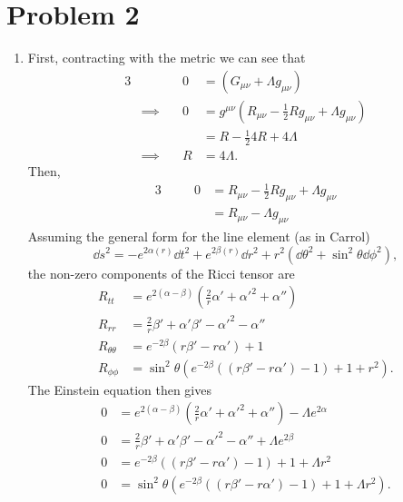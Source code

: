 \documentclass[12pt]{article}
\begin{document}
\section*{Problem 2}
\begin{enumerate}[label=(\alph*)]
    \item First, contracting with the metric we can see that
    \begin{alignat*}{3}
        &\quad & 0 &= \left(G_{\mu\nu} + \Lambda g_{\mu\nu}\right) \\
        &\implies\quad & 0 &= g^{\mu\nu}\left(R_{\mu\nu} - \frac{1}{2}Rg_{\mu\nu} + \Lambda g_{\mu\nu}\right) \\
        &\quad &   &= R - \frac{1}{2}4R + 4\Lambda \\
        &\implies\quad & R &= 4\Lambda.
    \end{alignat*}
    Then,
    \begin{alignat*}{3}
        &\quad & 0 &= R_{\mu\nu} - \frac{1}{2}Rg_{\mu\nu} + \Lambda g_{\mu\nu} \\
        &\quad &   &= R_{\mu\nu} - \Lambda g_{\mu\nu}
    \end{alignat*}
    Assuming the general form for the line element (as in Carrol)
    \[ \dd s^2 = -e^{2\alpha(r)}\dd t^2 + e^{2\beta(r)}\dd r^2 + r^2\left(\dd\theta^2 + \sin^2\theta\dd\phi^2\right), \]
    the non-zero components of the Ricci tensor are
    \begin{align*}
        R_{tt} &= e^{2(\alpha-\beta)}\left(\frac{2}{r}\alpha' + \alpha'^2 + \alpha''\right) \\
        R_{rr} &= \frac{2}{r}\beta' + \alpha'\beta' -  \alpha'^2 - \alpha'' \\
        R_{\theta\theta} &= e^{-2\beta}\left(r\beta' - r\alpha'\right) + 1 \\
        R_{\phi\phi} &= \sin^2\theta\left(e^{-2\beta}\left(\left(r\beta' - r\alpha'\right) -1\right) + 1 + r^2\right).
    \end{align*}
    The Einstein equation then gives
    \begin{align*}
        0 &= e^{2(\alpha-\beta)}\left(\frac{2}{r}\alpha' + \alpha'^2 + \alpha''\right) - \Lambda e^{2\alpha} \\
        0 &= \frac{2}{r}\beta' + \alpha'\beta' -  \alpha'^2 - \alpha'' + \Lambda e^{2\beta} \\
        0 &= e^{-2\beta}\left(\left(r\beta' - r\alpha'\right) -1\right) + 1 + \Lambda r^2 \\
        0 &= \sin^2\theta\left(e^{-2\beta}\left(\left(r\beta' - r\alpha'\right) -1\right) + 1 + \Lambda r^2\right).

\end{align*}
\end{enumerate}
\end{document}
